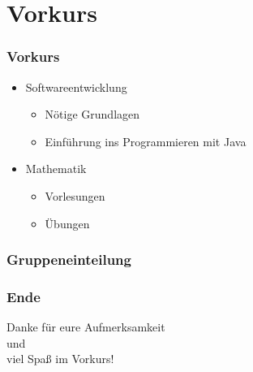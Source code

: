 \documentclass{beamer}
\begin{document}
\section{Vorkurs}
\begin{frame}
\frametitle{Vorkurs}
\begin{itemize}
	\item Softwareentwicklung
		\begin{itemize}
			\item Nötige Grundlagen
			\item Einführung ins Programmieren mit Java
		\end{itemize}
	\item Mathematik
		\begin{itemize}
			\item Vorlesungen
			\item Übungen
		\end{itemize}
\end{itemize}
\end{frame}


\begin{frame}
\frametitle{Gruppeneinteilung}
\end{frame}


\begin{frame}
\frametitle{Ende}
\begin{center}
Danke für eure Aufmerksamkeit\\
und\\
viel Spaß im Vorkurs!
\end{center}
\end{frame}
\end{document}
